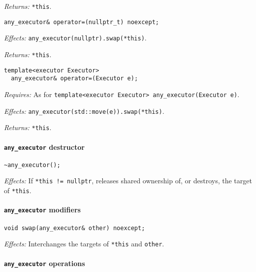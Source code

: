 \documentclass[a4paper,12pt,notitlepage,twoside,openright]{article}
\begin{document}
\emph{Returns:} \texttt{*this}.

\begin{verbatim}
any_executor& operator=(nullptr_t) noexcept;
\end{verbatim}

\emph{Effects:} \texttt{any_executor(nullptr).swap(*this)}.

\emph{Returns:} \texttt{*this}.

\begin{verbatim}
template<executor Executor>
  any_executor& operator=(Executor e);
\end{verbatim}

\emph{Requires:} As for
\texttt{template<executor Executor> any_executor(Executor e)}.

\emph{Effects:}
\texttt{any_executor(std::move(e)).swap(*this)}.

\emph{Returns:} \texttt{*this}.

\hypertarget{any_executor-destructor}{%
\paragraph{\texorpdfstring{\texttt{any_executor}
destructor}{ destructor}}\label{any_executor-destructor}}

\begin{verbatim}
~any_executor();
\end{verbatim}

\emph{Effects:} If \texttt{*this != nullptr}, releases
shared ownership of, or destroys, the target of
\texttt{*this}.

\hypertarget{any_executor-modifiers}{%
\paragraph{\texorpdfstring{\texttt{any_executor}
modifiers}{ modifiers}}\label{any_executor-modifiers}}

\begin{verbatim}
void swap(any_executor& other) noexcept;
\end{verbatim}

\emph{Effects:} Interchanges the targets of \texttt{*this}
and \texttt{other}.

\hypertarget{any_executor-operations}{%
\paragraph{\texorpdfstring{\texttt{any_executor}
operations}{ operations}}\label{any_executor-operations}}
\end{document}
